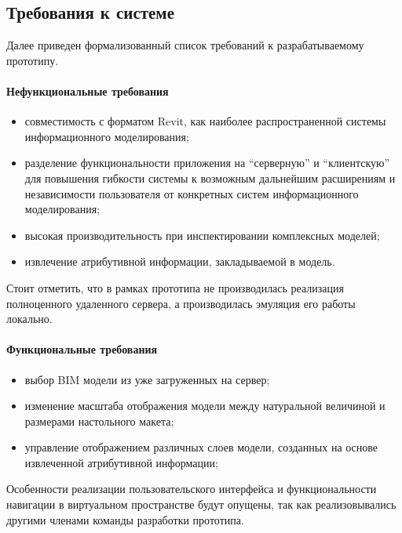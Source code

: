 ﻿\subsection{Требования к системе}

Далее приведен формализованный список требований к разрабатываемому прототипу.

\paragraph{Нефункциональные требования}
\begin{itemize}
    \item совместимость с форматом Revit,
    как наиболее распространенной системы информационного моделирования;
    \item разделение функциональности приложения на ``серверную'' и ``клиентскую''
    для повышения гибкости системы к возможным дальнейшим расширениям и
    независимости пользователя от конкретных систем информационного моделирования;
    \item высокая производительность при инспектировании комплексных моделей;
    \item извлечение атрибутивной информации,
    закладываемой в модель.
\end{itemize}

Стоит отметить, что в рамках прототипа не производилась
реализация полноценного удаленного сервера,
а производилась эмуляция его работы локально.

\paragraph{Функциональные требования}
\begin{itemize}
    \item выбор BIM модели из уже загруженных на сервер;
    \item изменение масштаба отображения модели
    между натуральной величиной и размерами настольного макета;
    \item управление отображением различных слоев модели,
    созданных на основе извлеченной атрибутивной информации;
\end{itemize}

Особенности реализации пользовательского интерфейса и
функциональности навигации в виртуальном пространстве будут опущены,
так как реализовывались другими членами команды разработки прототипа.